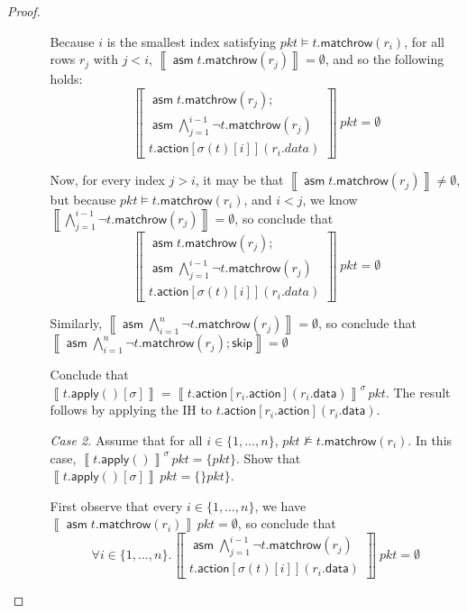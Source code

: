 \documentclass{article}
\newcommand{\pkt}{\mathit{pkt}}
\newcommand{\denote}[1]{\left\llbracket#1\right\rrbracket}
\newcommand{\action}{\mathsf{action}}
\newcommand{\data}{\mathsf{data}}
\newcommand{\assume}{\mathop{\mathsf{asm}}}
\newcommand{\apply}{\mathsf{apply}}
\newcommand{\SKIP}{\mathsf{skip}}
\newcommand{\matchrow}{\mathsf{matchrow}}
\theoremstyle{plain}
\theoremstyle{definition}
\theoremstyle{remark}
\begin{document}
\begin{proof}
\begin{enumerate}[align=left]
\begin{enumerate}
        Because $i$ is the smallest index satisfying $\pkt \models
        t.\matchrow(r_i)$, for all rows $r_j$ with $j < i$, $\denote{\assume
          t.\matchrow(r_j)} = \emptyset$, and so the following holds: \[
          \denote{
          \begin{array}{l}
            \assume t.\matchrow(r_j);\\
            \assume \bigwedge_{j=1}^{i-1}\neg t.\matchrow(r_j)\\
            t.\action[\sigma(t)[i]](r_i.data)
        \end{array}}\,\pkt = \emptyset
          \]

        Now, for every index $j > i$, it may be that $\denote{\assume
          t.\matchrow(r_j)} \neq \emptyset$, but because $\pkt \models
        t.\matchrow(r_i)$, and $i < j$, we know $\denote{\bigwedge_{j=1}^{i-1}
          \neg t.\matchrow(r_j)} = \emptyset$, so conclude that \[
          \denote{
          \begin{array}{l}
            \assume t.\matchrow(r_j);\\
            \assume \bigwedge_{j=1}^{i-1}\neg t.\matchrow(r_j)\\
            t.\action[\sigma(t)[i]](r_i.data)
        \end{array}}\,\pkt = \emptyset
          \]

        Similarly, $\denote{\assume \bigwedge_{i=1}^{n} \neg t.\matchrow(r_j)} =
        \emptyset$, so conclude that $\denote{\assume \bigwedge_{i=1}^{n} \neg
          t.\matchrow(r_j);\SKIP} = \emptyset$


        Conclude that $\denote{t.\apply()[\sigma]} =
        \denote{t.\action[r_i.\action](r_i.\data)}^\sigma\,\pkt$. The result
        follows by applying the IH to $t.\action[r_i.\action](r_i.\data)$.

        \item[\textit{Case 2.}] Assume that for all $i \in \{1, \ldots, n\}$,
          $\pkt \not\models t.\matchrow(r_i)$. In this case,
          $\denote{t.\apply()}^\sigma\,\pkt = \{\pkt\}$. Show that $\denote{t.\apply()[\sigma]}\,\pkt = \{\}\pkt\}$.

          First observe that every $i \in \{1, \ldots, n\}$, we have
          $\denote{\assume t.\matchrow(r_i)}\,\pkt = \emptyset$, so conclude
          that
          \[ \forall i \in \{1,\ldots,n\}.\denote{
          \begin{array}{l}
            \assume \bigwedge_{j=1}^{i-1}\neg t.\matchrow(r_j)\\
            t.\action[\sigma(t)[i]](r_i.\data)
        \end{array}}\,\pkt = \emptyset
          \]


\end{enumerate}
\end{enumerate}
\end{proof}
\end{document}
